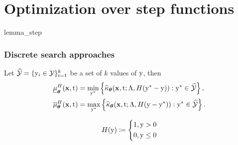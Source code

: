 \section{Optimization over step functions}
\label{app:step}
{lemma_step}

\subsubsection{Discrete search approaches}
Let $\widehat{\mathcal{Y}}=\{\mathrm{y}_i \in \mathcal{Y}\}_{i=1}^{k}$ be a set of $k$ values of $\mathrm{y}$, then
\begin{equation*}
    \begin{split}
         \underline{\mu}_{\bm{\theta}}^{H}(\mathbf{x}, \mathrm{t}) &= \min_{\mathrm{y}^{*}} \left\{ \widehat{\kappa}_{\bm{\theta}}(\mathbf{x}, \mathrm{t}; \Lambda, H(\mathrm{y}^{*} - \mathrm{y})): \mathrm{y}^{*} \in \widehat{\mathcal{Y}} \right\}, \\
         \overline{\mu}_{\bm{\theta}}^{H}(\mathbf{x}, \mathrm{t}) &= \max_{\mathrm{y}^{*}} \left\{ \widehat{\kappa}_{\bm{\theta}}(\mathbf{x}, \mathrm{t}; \Lambda, H(\mathrm{y} - \mathrm{y}^{*})): \mathrm{y}^{*} \in \widehat{\mathcal{Y}} \right\}.
    \end{split}
\end{equation*}

\begin{equation*}
    H(\y) \coloneqq 
    \begin{dcases*}
        1, \y > 0 \\
        0, \y \leq 0
    \end{dcases*}
\end{equation*}

